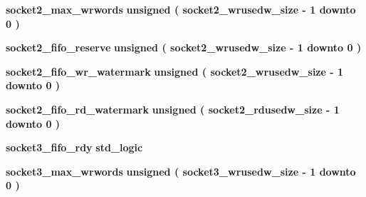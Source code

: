 \begin{DoxyCompactItemize}
\item 
{\bf socket2\+\_\+max\+\_\+wrwords} {\bfseries \textcolor{comment}{unsigned}\textcolor{vhdlchar}{ }\textcolor{vhdlchar}{(}\textcolor{vhdlchar}{ }\textcolor{vhdlchar}{ }\textcolor{vhdlchar}{ }\textcolor{vhdlchar}{ }{\bfseries {\bf socket2\+\_\+wrusedw\+\_\+size}} \textcolor{vhdlchar}{-\/}\textcolor{vhdlchar}{ } \textcolor{vhdldigit}{1} \textcolor{vhdlchar}{ }\textcolor{keywordflow}{downto}\textcolor{vhdlchar}{ }\textcolor{vhdlchar}{ } \textcolor{vhdldigit}{0} \textcolor{vhdlchar}{ }\textcolor{vhdlchar}{)}\textcolor{vhdlchar}{ }} 
\item 
{\bf socket2\+\_\+fifo\+\_\+reserve} {\bfseries \textcolor{comment}{unsigned}\textcolor{vhdlchar}{ }\textcolor{vhdlchar}{(}\textcolor{vhdlchar}{ }\textcolor{vhdlchar}{ }\textcolor{vhdlchar}{ }\textcolor{vhdlchar}{ }{\bfseries {\bf socket2\+\_\+wrusedw\+\_\+size}} \textcolor{vhdlchar}{-\/}\textcolor{vhdlchar}{ } \textcolor{vhdldigit}{1} \textcolor{vhdlchar}{ }\textcolor{keywordflow}{downto}\textcolor{vhdlchar}{ }\textcolor{vhdlchar}{ } \textcolor{vhdldigit}{0} \textcolor{vhdlchar}{ }\textcolor{vhdlchar}{)}\textcolor{vhdlchar}{ }} 
\item 
{\bf socket2\+\_\+fifo\+\_\+wr\+\_\+watermark} {\bfseries \textcolor{comment}{unsigned}\textcolor{vhdlchar}{ }\textcolor{vhdlchar}{(}\textcolor{vhdlchar}{ }\textcolor{vhdlchar}{ }\textcolor{vhdlchar}{ }\textcolor{vhdlchar}{ }{\bfseries {\bf socket2\+\_\+wrusedw\+\_\+size}} \textcolor{vhdlchar}{-\/}\textcolor{vhdlchar}{ } \textcolor{vhdldigit}{1} \textcolor{vhdlchar}{ }\textcolor{keywordflow}{downto}\textcolor{vhdlchar}{ }\textcolor{vhdlchar}{ } \textcolor{vhdldigit}{0} \textcolor{vhdlchar}{ }\textcolor{vhdlchar}{)}\textcolor{vhdlchar}{ }} 
\item 
{\bf socket2\+\_\+fifo\+\_\+rd\+\_\+watermark} {\bfseries \textcolor{comment}{unsigned}\textcolor{vhdlchar}{ }\textcolor{vhdlchar}{(}\textcolor{vhdlchar}{ }\textcolor{vhdlchar}{ }\textcolor{vhdlchar}{ }\textcolor{vhdlchar}{ }{\bfseries {\bf socket2\+\_\+rdusedw\+\_\+size}} \textcolor{vhdlchar}{-\/}\textcolor{vhdlchar}{ } \textcolor{vhdldigit}{1} \textcolor{vhdlchar}{ }\textcolor{keywordflow}{downto}\textcolor{vhdlchar}{ }\textcolor{vhdlchar}{ } \textcolor{vhdldigit}{0} \textcolor{vhdlchar}{ }\textcolor{vhdlchar}{)}\textcolor{vhdlchar}{ }} 
\item 
{\bf socket3\+\_\+fifo\+\_\+rdy} {\bfseries \textcolor{comment}{std\+\_\+logic}\textcolor{vhdlchar}{ }} 
\item 
{\bf socket3\+\_\+max\+\_\+wrwords} {\bfseries \textcolor{comment}{unsigned}\textcolor{vhdlchar}{ }\textcolor{vhdlchar}{(}\textcolor{vhdlchar}{ }\textcolor{vhdlchar}{ }\textcolor{vhdlchar}{ }\textcolor{vhdlchar}{ }{\bfseries {\bf socket3\+\_\+wrusedw\+\_\+size}} \textcolor{vhdlchar}{-\/}\textcolor{vhdlchar}{ } \textcolor{vhdldigit}{1} \textcolor{vhdlchar}{ }\textcolor{keywordflow}{downto}\textcolor{vhdlchar}{ }\textcolor{vhdlchar}{ } \textcolor{vhdldigit}{0} \textcolor{vhdlchar}{ }\textcolor{vhdlchar}{)}\textcolor{vhdlchar}{ }} 

\end{DoxyCompactItemize}
